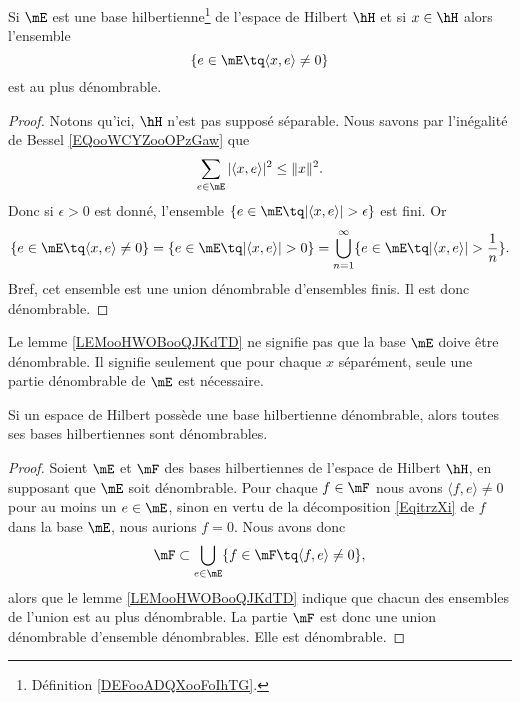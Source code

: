 \begin{lemma}       \label{LEMooHWOBooQJKdTD}
    Si \( \mE\) est une base hilbertienne\footnote{Définition \ref{DEFooADQXooFoIhTG}.} de l'espace de Hilbert \( \hH\) et si \( x\in \hH\) alors l'ensemble
    \begin{equation}
        \{ e\in\mE\tq \langle x, e\rangle \neq 0 \}
    \end{equation}
    est au plus dénombrable.
\end{lemma}

\begin{proof}
    Notons qu'ici, \( \hH\) n'est pas supposé séparable. Nous savons par l'inégalité de Bessel \eqref{EQooWCYZooOPzGaw} que
    \begin{equation}
        \sum_{e\in\mE}| \langle x, e\rangle  |^2\leq \| x \|^2.
    \end{equation}
    Donc si \( \epsilon>0\) est donné, l'ensemble \( \{ e\in \mE\tq| \langle x, e\rangle  |>\epsilon \}\) est fini. Or
    \begin{equation}
        \{ e\in\mE\tq \langle x, e\rangle \neq 0  \}=\{ e\in\mE\tq| \langle x, e\rangle  |>0 \}=\bigcup_{n=1}^{\infty}\{ e\in\mE\tq | \langle x, e\rangle  |>\frac{1}{ n } \}.
    \end{equation}
    Bref, cet ensemble est une union dénombrable d'ensembles finis. Il est donc dénombrable.
\end{proof}

\begin{remark}
    Le lemme \ref{LEMooHWOBooQJKdTD} ne signifie pas que la base \( \mE\) doive être dénombrable. Il signifie seulement que pour chaque \( x\) séparément, seule une partie dénombrable de \( \mE\) est nécessaire.
\end{remark}

\begin{corollary}       \label{CORooFROTooNupAQs}
    Si un espace de Hilbert possède une base hilbertienne dénombrable, alors toutes ses bases hilbertiennes sont dénombrables.
\end{corollary}

\begin{proof}
    Soient \( \mE\) et \( \mF\) des bases hilbertiennes de l'espace de Hilbert \( \hH\), en supposant que \( \mE\) soit dénombrable. Pour chaque \( f\in \mF\) nous avons \( \langle f, e\rangle \neq 0\) pour au moins un \( e\in\mE\), sinon en vertu de la décomposition \eqref{EqitrzXi} de \( f\) dans la base \( \mE\), nous aurions \( f=0\). Nous avons donc
    \begin{equation}    \label{EQooKRTFooNABXnH}
        \mF\subset\bigcup_{e\in \mE}\{ f\in\mF\tq \langle f, e\rangle \neq 0 \},
    \end{equation}
    alors que le lemme \ref{LEMooHWOBooQJKdTD} indique que chacun des ensembles de l'union est au plus dénombrable. La partie \( \mF\) est donc une union dénombrable d'ensemble dénombrables. Elle est dénombrable.
\end{proof}

